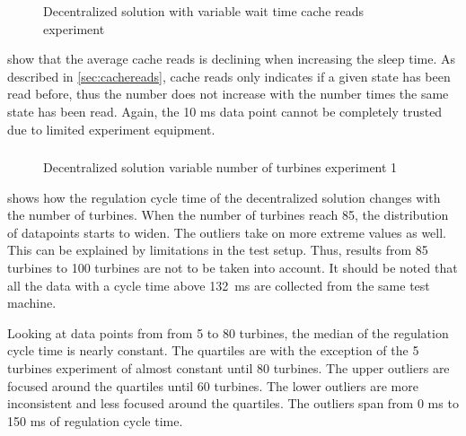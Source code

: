 \begin{figure}[h!]
	\centering
	
	\caption{Decentralized solution with variable wait time cache reads experiment}
	\label{fig:exp:decen:sleep-cache}
\end{figure}

\FloatBarrier

 show that the average cache reads is declining when increasing the sleep time. As described in \cref{sec:cachereads}, cache reads only indicates if a given state has been read before, thus the number does not increase with the number times the same state has been read. Again, the 10 ms data point cannot be completely trusted due to limited experiment equipment.

\clearpage
\subsubsection{}

\begin{figure}[h!]
	\centering
%	
	
	
	\caption{Decentralized solution variable number of turbines experiment 1}
	\label{fig:exp:decen:turbines}
\end{figure}

 shows how the regulation cycle time of the decentralized solution changes with the number of turbines.
When the number of turbines reach 85, the distribution of datapoints starts to widen. The outliers take on more extreme values as well. This can be explained by limitations in the test setup. Thus, results from 85 turbines to 100 turbines are not to be taken into account.
It should be noted that all the data with a cycle time above 132~ms are collected from the same test machine.

Looking at data points from from 5 to 80 turbines, the median of the regulation cycle time is nearly constant.
The quartiles are with the exception of the 5 turbines experiment of almost constant until 80 turbines. The upper outliers are focused around the quartiles until 60 turbines. The lower outliers are more inconsistent and less focused around the quartiles.
The outliers span from 0 ms to 150 ms of regulation cycle time.

